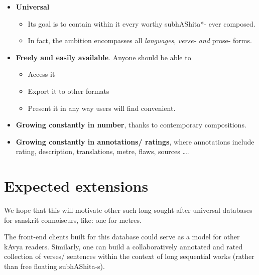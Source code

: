 \documentclass[11pt]{article}
\begin{document}
\begin{itemize}

\item
  \textbf{Universal}

  \begin{itemize}
  
  \item
    Its goal is to contain within it every worthy subhAShita*- ever
    composed.
  \item
    In fact, the ambition encompasses all \emph{languages}, \emph{verse-
    and }prose- forms.
  \end{itemize}
\item
  \textbf{Freely and easily available}. Anyone should be able to

  \begin{itemize}
  
  \item
    Access it
  \item
    Export it to other formats
  \item
    Present it in any way users will find convenient.
  \end{itemize}
\item
  \textbf{Growing constantly in number}, thanks to contemporary compositions.
\item
  \textbf{Growing constantly in annotations/ ratings}, where annotations include rating, description, translations, metre, flaws,
    sources \ldots.
\end{itemize}

\section{Expected extensions}
We hope that this will motivate other such long-sought-after universal databases for sanskrit connoiseurs, like: one for metres.

The front-end clients built for this database could serve as a model for other kAvya readers. Similarly, one can build a collaboratively annotated and rated collection of verses/ sentences within the context of long sequential works (rather than free floating subhAShita-s).



\end{document}
